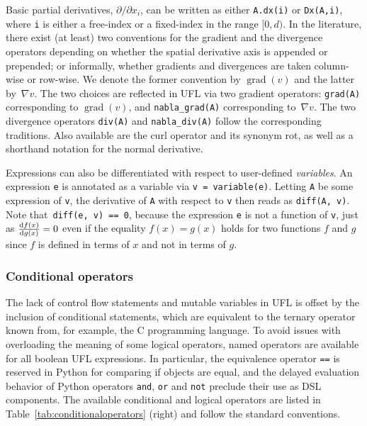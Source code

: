 \documentclass[prodmode,acmtoms]{acmsmall}
\DeclareMathOperator{\Grad}{grad}
\newcommand{\uflc}[1]{\texttt{#1}}
\begin{document}
Basic partial derivatives, $\partial /\partial x_i$, can be
written as either \uflc{A.dx(i)} or \uflc{Dx(A,i)}, where
\uflc{i} is either a free-index or a fixed-index in the range
$[0,d)$. In the literature, there exist (at least) two conventions for
the gradient and the divergence operators depending on whether the
spatial derivative axis is appended or prepended; or informally,
whether gradients and divergences are taken column-wise or
row-wise. We denote the former convention by $\Grad(v)$ and the latter
by~$\nabla v$.  The two choices are reflected in UFL via two gradient
operators: \uflc{grad(A)} corresponding to $\Grad(v)$, and
\uflc{nabla\_grad(A)} corresponding to~$\nabla v$.  The two
divergence operators \uflc{div(A)} and \uflc{nabla\_div(A)} follow
the corresponding traditions. Also available are the curl operator and its
synonym rot, as well as a shorthand notation for the normal
derivative.

Expressions can also be differentiated with respect to user-defined
\emph{variables}. An expression \uflc{e} is annotated as a variable
via \uflc{v = variable(e)}. Letting \uflc{A} be some expression of
\uflc{v}, the derivative of \uflc{A} with respect to \uflc{v}
then reads as \uflc{diff(A, v)}. Note that~\uflc{diff(e, v) == 0},
because the expression \uflc{e} is not a function of \uflc{v},
just as $\frac{\dif f(x)}{\dif g(x)} = 0$ even if the equality
$f(x) = g(x)$ holds for two functions $f$ and $g$ since $f$ is defined
in terms of $x$ and not in terms of $g$.

\subsubsection{Conditional operators}
\label{sec:conditionaloperators}

The lack of control flow statements and mutable variables in UFL is
offset by the inclusion of conditional statements, which are
equivalent to the ternary operator known from, for example, the C
programming language.  To avoid issues with overloading the meaning of
some logical operators, named operators are available for all boolean
UFL expressions.  In particular, the equivalence operator \uflc{==}
is reserved in Python for comparing if objects are equal, and the
delayed evaluation behavior of Python operators \uflc{and},
\uflc{or} and \uflc{not} preclude their use as DSL components.  The
available conditional and logical operators are listed in
Table~\ref{tab:conditionaloperators} (right) and follow the standard
conventions.
\end{document}
